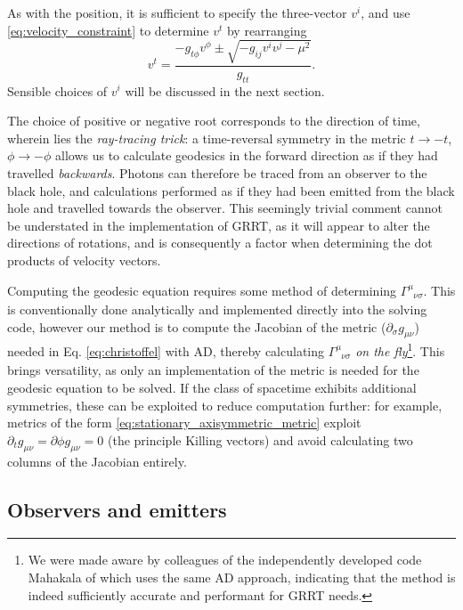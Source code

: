 \documentclass[fleqn,usenatbib]{mnras}
\newcommand{\utensor}[3]{#1^{#2}_{\phantom{#2}#3}}
\newcommand{\vel}[1]{v^{#1}}
\begin{document}
As with the position, it is sufficient to specify the three-vector $\vel{i}$,
and use \eqref{eq:velocity_constraint} to determine $\vel{t}$ by rearranging
\begin{equation}
\vel{t}  = \frac{-g_{t\phi} \vel{\phi} \pm
    \sqrt{-g_{ij} \vel{i} \vel{j} - \mu^2}
}{g_{tt}}.
\end{equation}
Sensible choices of $v^i$ will be discussed in the next section.

The choice of positive or negative root corresponds to the direction of time,
wherein lies the \textit{ray-tracing trick}: a time-reversal symmetry in the
metric $t \rightarrow -t$, $\phi \rightarrow -\phi$ allows us to calculate
geodesics in the forward direction as if they had travelled \textit{backwards}.
Photons can therefore be traced from an observer to the black hole, and
calculations performed as if they had been emitted from the black hole and
travelled towards the observer. This seemingly trivial comment cannot be
understated in the implementation of GRRT, as it will appear to alter the
directions of rotations, and is consequently a factor when determining the dot
products of velocity vectors.

Computing the geodesic equation requires some method of determining
$\utensor{\Gamma}{\mu}{\nu\sigma}$. This is conventionally done analytically and
implemented directly into the solving code, however our method is to compute the
Jacobian of the metric ($\partial_{\sigma} g_{\mu \nu}$) needed in Eq.
\eqref{eq:christoffel} with AD, thereby calculating
$\utensor{\Gamma}{\mu}{\nu\sigma}$ \textit{on the fly}\footnote{We were made
    aware by colleagues of the independently developed code Mahakala of
    \citet{sharma_mahakala_2023} which uses the same AD approach, indicating
that the method is indeed sufficiently accurate and performant for GRRT needs.}.
This brings versatility, as only an implementation of the metric is needed for
the geodesic equation to be solved.  If the class of spacetime exhibits
additional symmetries, these can be exploited to reduce computation further: for
example, metrics of the form \eqref{eq:stationary_axisymmetric_metric} exploit
$\partial_t g_{\mu\nu} = \partial{\phi} g_{\mu\nu} = 0$ (the principle Killing
vectors) and avoid calculating two columns of the Jacobian entirely.

\subsection{Observers and emitters}
\label{sec:observers-and-emitters}
\end{document}
